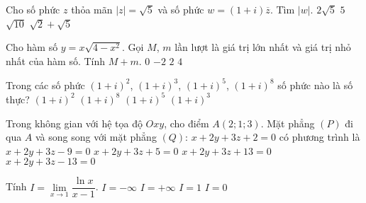 \begin{ex}%
Cho số phức $z$ thỏa mãn $|z|=\sqrt{5}$ và số phức $w=(1+i)\overline{z}$. Tìm $|w|$.
\choice
{$2\sqrt{5}$}
{$5$}
{\True $\sqrt{10}$}
{$\sqrt{2}+\sqrt{5}$}
\end{ex}

\begin{ex}%
Cho hàm số $y=x\sqrt{4-x^2}$. Gọi $M$, $m$ lần lượt là giá trị lớn nhất và giá trị nhỏ nhất của hàm số. Tính $M+m$.
\choice
{\True $0$}
{$-2$}
{$2$}
{$4$}
\end{ex}

\begin{ex}%
Trong các số phức $(1+i)^2$, $(1+i)^3$, $(1+i)^5$, $(1+i)^8$ số phức nào là số thực?
\choice
{$(1+i)^2$}
{\True $(1+i)^8$}
{$(1+i)^5$}
{$(1+i)^3$}
\end{ex}

\begin{ex}%
Trong không gian với hệ tọa độ $Oxy$, cho điểm $A(2;1;3)$. Mặt phẳng $(P)$ đi qua $A$ và song song với mặt phẳng $(Q)$: $x+2y+3z+2=0$ có phương trình là
\choice
{$x+2y+3z-9=0$}
{$x+2y+3z+5=0$}
{$x+2y+3z+13=0$}
{\True $x+2y+3z-13=0$}
\end{ex}

\begin{ex}%
Tính $I=\lim\limits_{x\rightarrow 1}\dfrac{\ln x}{x-1}$.
\choice
{$I=-\infty$}
{$I=+\infty$}
{\True $I=1$}
{$I=0$}
\end{ex}



